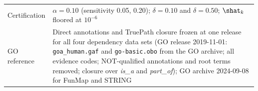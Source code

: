 \begin{table}[!t]
\begin{tabular}{p{} p{}}
Certification & $\alpha=0.10$ (sensitivity 0.05, 0.20); $\delta=0.10$ and $\delta=0.50$; $\shat_k$ floored at $10^{-6}$ \\
GO reference & Direct annotations and TruePath closure frozen at one release for all four dependency data sets (GO release 2019-11-01: \texttt{goa\_human.gaf} and \texttt{go-basic.obo} from the GO archive; all evidence codes; NOT-qualified annotations and root terms removed; closure over \emph{is\_a} and \emph{part\_of}); GO archive 2024-09-08 for FunMap and STRING \\
\bottomrule
\end{tabular}
\end{table}
